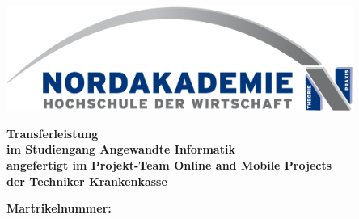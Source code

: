 
\thispagestyle{empty}
\begin{center}
\vspace*{-2cm}
\includegraphics[width=0.85\textwidth]{Bilder/Logo_NAK}\\
\vspace*{1.5cm}
    {\titlefont\huge\onehalfspacing{}
	\thetitle{}
    \par}%
\vfill
{
\vspace*{1.5cm}
    \normalfont\normalcolor\bfseries\large
    Transferleistung \\
    \large
    im Studiengang Angewandte Informatik\\
    angefertigt im Projekt-Team Online and Mobile Projects\\
    der Techniker Krankenkasse\\
    \par
}
\noindent \textbf{Martrikelnummer: \theauthor}\\
\end{center}\par
\noindent\begin{minipage}[b]{\textwidth}
{

  \vspace*{5cm}
  \noindent\textbf{\theLocationAndDate}
}
\end{minipage}
